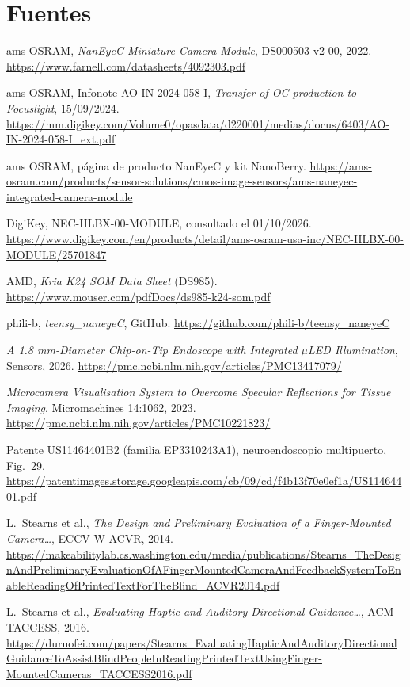 \documentclass[11pt,a4paper]{article}
\begin{document}
\section*{Fuentes}
\begin{small}
\begin{enumerate}[label={[S\arabic*]}, leftmargin=2.6em, itemsep=1pt]
  \item ams OSRAM, \emph{NanEyeC Miniature Camera Module}, DS000503 v2-00, 2022. \url{https://www.farnell.com/datasheets/4092303.pdf}
  \item ams OSRAM, Infonote AO-IN-2024-058-I, \emph{Transfer of OC production to Focuslight}, 15/09/2024. \url{https://mm.digikey.com/Volume0/opasdata/d220001/medias/docus/6403/AO-IN-2024-058-I_ext.pdf}
  \item ams OSRAM, página de producto NanEyeC y kit NanoBerry. \url{https://ams-osram.com/products/sensor-solutions/cmos-image-sensors/ams-naneyec-integrated-camera-module}
  \item DigiKey, NEC-HLBX-00-MODULE, consultado el 01/10/2026. \url{https://www.digikey.com/en/products/detail/ams-osram-usa-inc/NEC-HLBX-00-MODULE/25701847}
  \item AMD, \emph{Kria K24 SOM Data Sheet} (DS985). \url{https://www.mouser.com/pdfDocs/ds985-k24-som.pdf}
  \item phili-b, \emph{teensy\_naneyeC}, GitHub. \url{https://github.com/phili-b/teensy_naneyeC}
  \item \emph{A 1.8 mm-Diameter Chip-on-Tip Endoscope with Integrated $\mu$LED Illumination}, Sensors, 2026. \url{https://pmc.ncbi.nlm.nih.gov/articles/PMC13417079/}
  \item \emph{Microcamera Visualisation System to Overcome Specular Reflections for Tissue Imaging}, Micromachines 14:1062, 2023. \url{https://pmc.ncbi.nlm.nih.gov/articles/PMC10221823/}
  \item Patente US11464401B2 (familia EP3310243A1), neuroendoscopio multipuerto, Fig.~29. \url{https://patentimages.storage.googleapis.com/cb/09/cd/f4b13f70e0ef1a/US11464401.pdf}
  \item L.~Stearns et al., \emph{The Design and Preliminary Evaluation of a Finger-Mounted Camera\ldots}, ECCV-W ACVR, 2014. \url{https://makeabilitylab.cs.washington.edu/media/publications/Stearns_TheDesignAndPreliminaryEvaluationOfAFingerMountedCameraAndFeedbackSystemToEnableReadingOfPrintedTextForTheBlind_ACVR2014.pdf}
  \item L.~Stearns et al., \emph{Evaluating Haptic and Auditory Directional Guidance\ldots}, ACM TACCESS, 2016. \url{https://duruofei.com/papers/Stearns_EvaluatingHapticAndAuditoryDirectionalGuidanceToAssistBlindPeopleInReadingPrintedTextUsingFinger-MountedCameras_TACCESS2016.pdf}

\end{enumerate}
\end{small}
\end{document}
